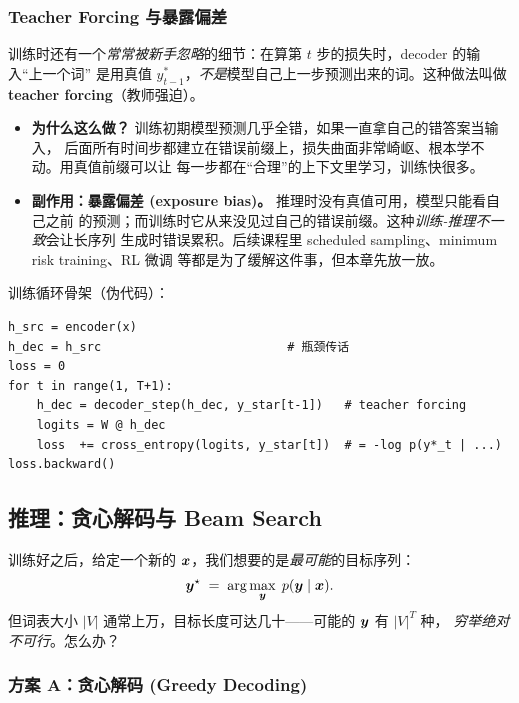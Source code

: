 \subsubsection{Teacher Forcing 与暴露偏差}

训练时还有一个\emph{常常被新手忽略}的细节：在算第 $t$ 步的损失时，decoder 的输入“上一个词”
是用真值 $y_{t-1}^*$，\emph{不是}模型自己上一步预测出来的词。这种做法叫做
\textbf{teacher forcing}（教师强迫）。

\begin{itemize}
    \item \textbf{为什么这么做？} 训练初期模型预测几乎全错，如果一直拿自己的错答案当输入，
          后面所有时间步都建立在错误前缀上，损失曲面非常崎岖、根本学不动。用真值前缀可以让
          每一步都在“合理”的上下文里学习，训练快很多。
    \item \textbf{副作用：暴露偏差 (exposure bias)。} 推理时没有真值可用，模型只能看自己之前
          的预测；而训练时它从来没见过自己的错误前缀。这种\emph{训练-推理不一致}会让长序列
          生成时错误累积。后续课程里 scheduled sampling、minimum risk training、RL 微调
          等都是为了缓解这件事，但本章先放一放。
\end{itemize}

\begin{engbox}
训练循环骨架（伪代码）：
\begin{lstlisting}
h_src = encoder(x)
h_dec = h_src                          # 瓶颈传话
loss = 0
for t in range(1, T+1):
    h_dec = decoder_step(h_dec, y_star[t-1])   # teacher forcing
    logits = W @ h_dec
    loss  += cross_entropy(logits, y_star[t])  # = -log p(y*_t | ...)
loss.backward()
\end{lstlisting}
\end{engbox}

\subsection{推理：贪心解码与 Beam Search}
\label{sec:decoding}

\begin{problemblock}
训练好之后，给定一个新的 $\boldsymbol{x}$，我们想要的是\emph{最可能}的目标序列：
\[
    \boldsymbol{y}^{\star} \;=\; \arg\max_{\boldsymbol{y}} \; p(\boldsymbol{y} \mid \boldsymbol{x}).
\]
但词表大小 $|V|$ 通常上万，目标长度可达几十——可能的 $\boldsymbol{y}$ 有 $|V|^T$ 种，
\emph{穷举绝对不可行}。怎么办？
\end{problemblock}

\subsubsection{方案 A：贪心解码 (Greedy Decoding)}

